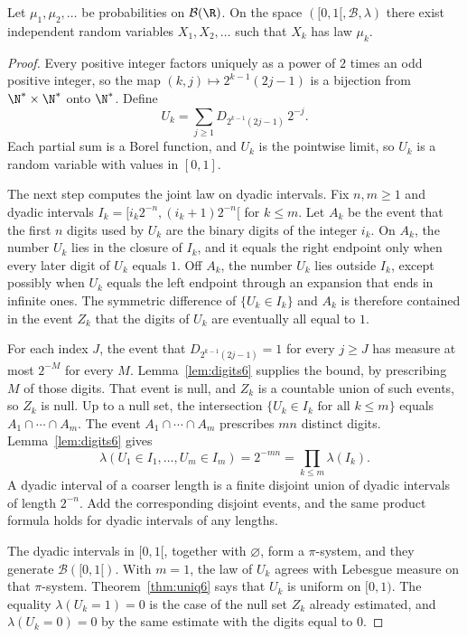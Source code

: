 \begin{theorem}\label{thm:independent}
Let $\mu_1,\mu_2,\ldots$ be probabilities on $\mathcal B(\R)$.
On the space $([0,1[,\mathcal B,\lambda)$ there exist independent random variables $X_1,X_2,\ldots$ such that $X_k$ has law $\mu_k$.
\end{theorem}
\begin{proof}
Every positive integer factors uniquely as a power of $2$ times an odd positive integer, so the map $(k,j)\mapsto 2^{k-1}(2j-1)$ is a bijection from $\N^*\times\N^*$ onto $\N^*$.
Define
\[U_k=\sum_{j\ge1}D_{2^{k-1}(2j-1)}\,2^{-j}.\]
Each partial sum is a Borel function, and $U_k$ is the pointwise limit, so $U_k$ is a random variable with values in $[0,1]$.

The next step computes the joint law on dyadic intervals.
Fix $n,m\ge1$ and dyadic intervals $I_k=[i_k 2^{-n},(i_k+1)2^{-n}[$ for $k\le m$.
Let $A_k$ be the event that the first $n$ digits used by $U_k$ are the binary digits of the integer $i_k$.
On $A_k$, the number $U_k$ lies in the closure of $I_k$, and it equals the right endpoint only when every later digit of $U_k$ equals $1$.
Off $A_k$, the number $U_k$ lies outside $I_k$, except possibly when $U_k$ equals the left endpoint through an expansion that ends in infinite ones.
The symmetric difference of $\{U_k\in I_k\}$ and $A_k$ is therefore contained in the event $Z_k$ that the digits of $U_k$ are eventually all equal to $1$.

For each index $J$, the event that $D_{2^{k-1}(2j-1)}=1$ for every $j\ge J$ has measure at most $2^{-M}$ for every $M$.
Lemma~\ref{lem:digits6} supplies the bound, by prescribing $M$ of those digits.
That event is null, and $Z_k$ is a countable union of such events, so $Z_k$ is null.
Up to a null set, the intersection $\{U_k\in I_k\text{ for all }k\le m\}$ equals $A_1\cap\cdots\cap A_m$.
The event $A_1\cap\cdots\cap A_m$ prescribes $mn$ distinct digits.
Lemma~\ref{lem:digits6} gives
\[\lambda(U_1\in I_1,\dots,U_m\in I_m)=2^{-mn}=\prod_{k\le m}\lambda(I_k).\]
A dyadic interval of a coarser length is a finite disjoint union of dyadic intervals of length $2^{-n}$.
Add the corresponding disjoint events, and the same product formula holds for dyadic intervals of any lengths.

The dyadic intervals in $[0,1[$, together with $\varnothing$, form a $\pi$-system, and they generate $\mathcal B([0,1[)$.
With $m=1$, the law of $U_k$ agrees with Lebesgue measure on that $\pi$-system.
Theorem~\ref{thm:uniq6} says that $U_k$ is uniform on $[0,1)$.
The equality $\lambda(U_k=1)=0$ is the case of the null set $Z_k$ already estimated, and $\lambda(U_k=0)=0$ by the same estimate with the digits equal to $0$.


\end{proof}
